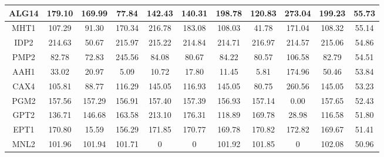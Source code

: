 \begin{table}[H]
\begin{center}
{\begin{tabular}{|c|c|c|c|c|c|c|c|c|c|c|}
ALG14           & 179.10             & 169.99             & 77.84             & 142.43                     & 140.31        & 198.78          & 120.83                 & 273.04          & 199.23            & 55.73        \\ \hline
MHT1            & 107.29             & 91.30              & 170.34            & 216.78                     & 183.08        & 108.03          & 41.78                  & 171.04          & 108.32            & 55.14        \\ \hline
IDP2            & 214.63             & 50.67              & 215.97            & 215.22                     & 214.84        & 214.71          & 216.97                 & 214.57          & 215.06            & 54.86        \\ \hline
PMP2            & 82.78              & 72.83              & 245.56            & 84.08                      & 80.67         & 84.22           & 80.57                  & 106.58          & 82.79             & 54.51        \\ \hline
AAH1            & 33.02              & 20.97              & 5.09              & 10.72                      & 17.80         & 11.45           & 5.81                   & 174.96          & 50.46             & 53.84        \\ \hline
CAX4            & 105.81             & 88.77              & 116.29            & 145.05                     & 116.93        & 145.05          & 80.75                  & 260.56          & 145.05            & 53.23        \\ \hline
PGM2            & 157.56             & 157.29             & 156.91            & 157.40                     & 157.39        & 156.93          & 157.14                 & 0.00            & 157.65            & 52.43        \\ \hline
GPT2            & 136.71             & 146.68             & 163.58            & 213.10                     & 176.31        & 118.89          & 169.78                 & 28.98           & 116.58            & 51.80        \\ \hline
EPT1            & 170.80             & 15.59              & 156.29            & 171.85                     & 170.77        & 169.78          & 170.82                 & 172.82          & 169.67            & 51.41        \\ \hline
MNL2            & 101.96             & 101.94             & 101.71            & 0                          & 0             & 101.92          & 101.85                 & 0               & 102.08            & 50.96  \\ \hline
\end{tabular}}
\label{table:fva_results}
\end{center}
\end{table}
